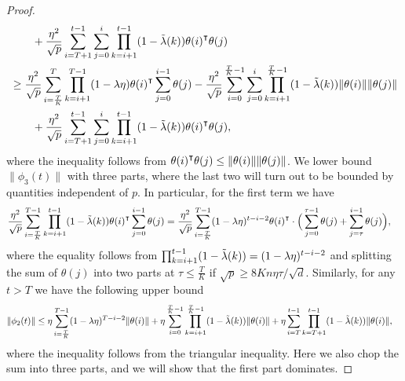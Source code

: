\begin{proof}
\begin{align*}
        & \qquad + \frac{\eta^2}{\sqrt p}\sum_{i=T+1}^{t-1}\sum_{j=0}^i\prod_{k=i+1}^{t-1}(1-\tlam(k))\theta(i)\transpose\theta(j) \\
        & \geq \frac{\eta^2}{\sqrt p}\sum_{i=\frac{T}{K}}^{T}\prod_{k=i+1}^{T-1}(1-\lambda\eta)\theta(i)\transpose\sum_{j=0}^{i-1} \theta(j) - \frac{\eta^2}{\sqrt p}\sum_{i=0}^{\frac{T}{K}-1}\sum_{j=0}^i\prod_{k=i+1}^{\frac{T}{K}-1}(1-\tlam(k)) \|\theta(i)\|\|\theta(j)\| \\
        & \qquad + \frac{\eta^2}{\sqrt p}\sum_{i=T+1}^{t-1}\sum_{j=0}^i\prod_{k=i+1}^{t-1}(1-\tlam(k)) \theta(i)\transpose \theta(j),
    \end{align*}
    where the inequality follows from $\theta(i)\transpose\theta(j) \leq \|\theta(i)\|\|\theta(j)\|$. We lower bound $\|\phi_{3}(t)\|$ with three parts, where the last two will turn out to be bounded by quantities independent of $p$. In particular, for the first term we have 
    \begin{align*}
        \frac{\eta^2}{\sqrt p}\sum_{i=\frac{T}{K}}^{T-1}\prod_{k=i+1}^{t-1}(1-\tlam(k))\theta(i)\transpose\sum_{j=0}^{i-1} \theta(j) & = \frac{\eta^2}{\sqrt p} \sum_{i=\frac{T}{K}}^{T-1} (1-\lambda\eta)^{t-i-2} \theta(i)\transpose \cdot \Big( \sum_{j=0}^{\tau-1} \theta(j) + \sum_{j=\tau}^{i-1} \theta(j) \Big),
    \end{align*}
    where the equality follows from $\prod_{k=i+1}^{t-1}(1-\tilde{\lambda}(k)) = (1-\lambda\eta)^{t-i-2}$ and splitting the sum of $\theta(j)$ into two parts at $\tau\leq \frac{T}{K}$ if $\sqrt{p} \geq 8Kn\eta\tau/\sqrt{d}$. 
    Similarly, for any $t>T$ we have the following upper bound
    \begin{align*}
        \|\phi_{2}(t)\| 
        &\leq  \eta\sum_{i=\frac{T}{K}}^{T-1} (1-\lambda\eta)^{T-i-2} \|\theta(i)\| + \eta\sum_{i=0}^{\frac{T}{K}-1}\prod_{k=i+1}^{\frac{T}{K}-1}(1-\tilde{\lambda}(k)) \|\theta(i)\| + \eta\sum_{i=T}^{t-1} \prod_{k=T+1}^{t-1}(1-\tilde{\lambda}(k)) \|\theta(i)\|,
    \end{align*}
    where the inequality follows from the triangular inequality. Here we also chop the sum into three parts, and we will show that the first part dominates. 
    

\end{proof}
